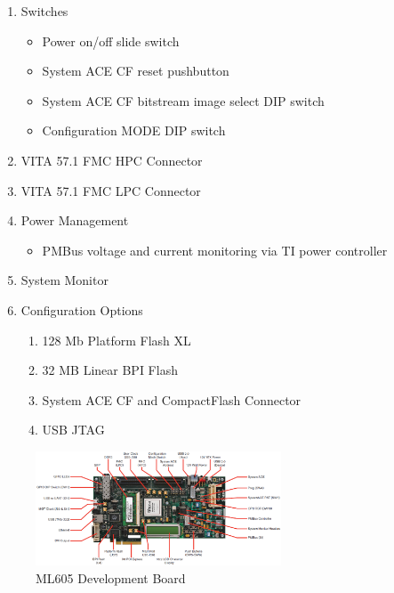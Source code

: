 \begin{enumerate}
  \item Switches
  \begin{itemize}
    \item Power on/off slide switch
    \item System ACE CF reset pushbutton
    \item System ACE CF bitstream image select DIP switch
    \item Configuration MODE DIP switch
  \end{itemize}

  \item VITA 57.1 FMC HPC Connector
  \item VITA 57.1 FMC LPC Connector
  \item Power Management

  \begin{itemize}
    \item PMBus voltage and current monitoring via TI power controller
  \end{itemize}

  \item System Monitor
  \item Configuration Options
  \begin{enumerate}
    \item 128 Mb Platform Flash XL
    \item 32 MB Linear BPI Flash
    \item System ACE CF and CompactFlash Connector
    \item USB JTAG
  \end{enumerate}

\end{enumerate}

\begin{figure}[htbp]
    \centering
    \includegraphics[width=0.65\textwidth]{./figures/ml605}
    \caption{ ML605 Development Board
    \label{fig:ml605}}
\end{figure}

